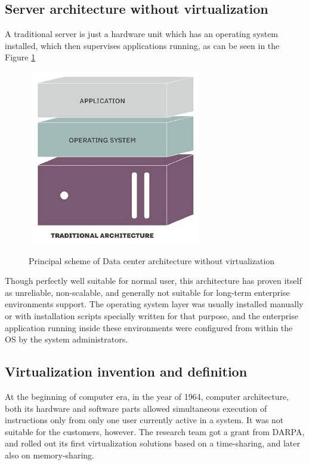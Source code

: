 \subsection{Server architecture without virtualization}

A traditional server is just a hardware unit
which has an operating system installed,
which then supervises applications running,
as can be seen in the Figure \ref{fig:TraditionalAndVirtualInfra}

\begin{figure}
\includegraphics[height=3in, width=3in]{traditional}
\caption{Principal scheme of Data center architecture without virtualization}
\cite{TraditionalAndVirtualInfra}
\label{fig:TraditionalAndVirtualInfra}
\end{figure}

Though perfectly well suitable for normal user, this architecture
has proven itself as unreliable, non-scalable,
and generally not suitable for long-term enterprise environments support.
The operating system layer was usually installed manually or with
installation scripts specially written for that purpose,
and the enterprise application running inside these
environments were configured from within the OS by the system administrators.

\subsection{Virtualization invention and definition}

At the beginning of computer era, in the year of 1964,
computer architecture, both its hardware and software
parts allowed simultaneous execution of instructions only from only one user
currently active in a system. It was not suitable for the customers, however.
The research team got a grant from DARPA, and
rolled out its first virtualization solutions based on a time-sharing,
and later also on memory-sharing.

